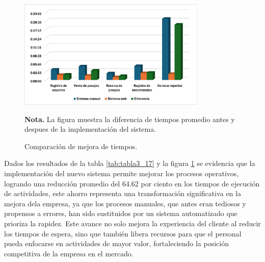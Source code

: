 	\begin{figure}[h] %
			\caption[Comparación de mejora de tiempos]
			{\newline Comparación de mejora de tiempos.} %
			\centering
			\includegraphics[width=0.8\textwidth]{imagenes/cap_3/Resultados.png} %
			
		\begin{flushleft}
			\begin{doublespace}
				\hspace{1.20cm} \textbf{Nota.} La figura muestra la diferencia de tiempos promedio antes y despues de la implementación del sistema. %
			\end{doublespace}
		\end{flushleft}
		\vspace{-16pt} %
		\label{fig:figura_resultados} %
	\end{figure}
	
	Dados los resultados de la tabla \ref{tab:tabla3_17} y la figura \ref{fig:figura_resultados} se evidencia que la implementación del nuevo sistema permite mejorar los procesos operativos, logrando una reducción promedio del 64.62 por ciento en los tiempos de ejecución de actividades, este ahorro representa una transformación significativa en la mejora dela empresa, ya que los procesos manuales, que antes eran tediosos y propensos a errores, han sido sustituidos por un sistema automatizado que prioriza la rapidez. Este avance no solo mejora la experiencia del cliente al reducir los tiempos de espera, sino que también libera recursos para que el personal pueda enfocarse en actividades de mayor valor, fortaleciendo la posición competitiva de la empresa en el mercado.